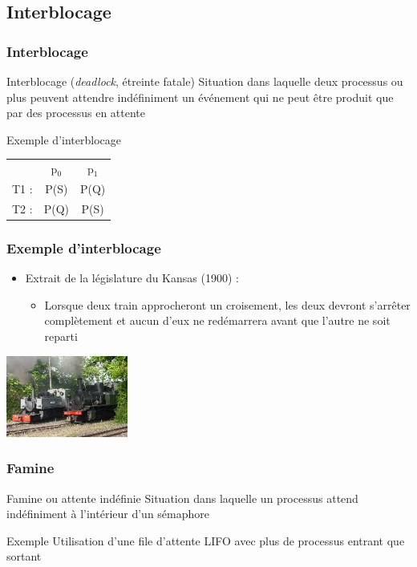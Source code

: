\subsection{Interblocage}

\begin{frame}
\frametitle{Interblocage}
\begin{block}{Interblocage (\textit{deadlock}, étreinte fatale)}
Situation dans laquelle deux processus ou plus peuvent attendre indéfiniment un événement qui ne peut être produit que par des processus en attente
\end{block}
\begin{exampleblock}{Exemple d'interblocage}
\begin{tabular}{ccc}
 & p$_0$ & p$_1$ \\ 
T1 : & P(S) & P(Q) \\ 
T2 : & P(Q) & P(S) \\ 
\end{tabular} 
\end{exampleblock}
\end{frame}

\begin{frame}
\frametitle{Exemple d'interblocage}
\begin{itemize}
\item Extrait de la législature du Kansas (1900) :
\begin{itemize}
\item Lorsque deux train approcheront un croisement, les deux devront s'arrêter complètement et aucun d'eux ne redémarrera avant que l'autre ne soit reparti
\end{itemize}
\end{itemize}
\begin{flushright}
\includegraphics[width=4cm]{../illustration/trains.png}
\end{flushright}
\end{frame}

\begin{frame}
\frametitle{Famine}
\begin{block}{Famine ou attente indéfinie}
Situation dans laquelle un processus attend indéfiniment à l’intérieur d’un sémaphore
\end{block}
\begin{exampleblock}{Exemple}
Utilisation d’une file d’attente LIFO avec plus de processus entrant que sortant
\end{exampleblock}
\end{frame}

